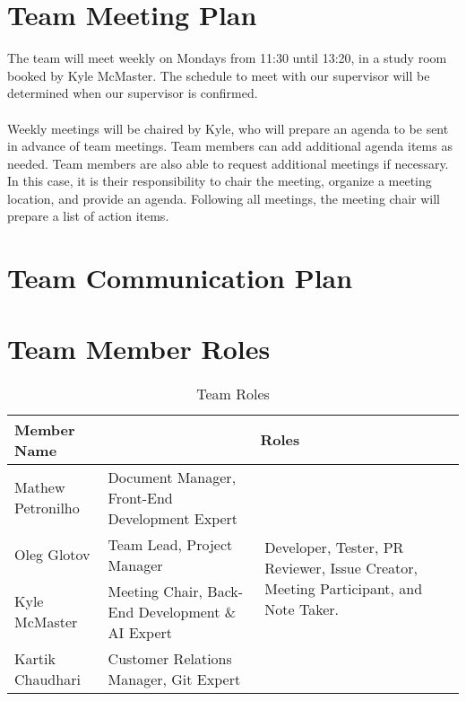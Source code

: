 \documentclass{article}
\begin{document}

\section{Team Meeting Plan}
The team will meet weekly on Mondays from 11:30 until 13:20, in a study room booked by Kyle McMaster.
The schedule to meet with our supervisor will be determined when our supervisor is confirmed.\\\\
Weekly meetings will be chaired by Kyle, who will prepare an agenda to be sent in advance of team meetings. Team members can add additional agenda items as
needed. Team members are also able to request additional meetings if necessary. In this case, it is their responsibility to chair the meeting, 
organize a meeting location, and provide an agenda. Following all meetings, the meeting chair will prepare a list of action items.

\section{Team Communication Plan}


\section{Team Member Roles}
\begin{table}[H]
  \centering
  \begin{tabular}{|p{3cm}|p{6cm}|p{3cm}|}
    \hline
    \textbf{Member Name} & \multicolumn{2}{c|}{\textbf{Roles}} \\
    \hline
    Mathew Petronilho  & Document Manager, Front-End Development Expert & \multirow{4}{*}{\parbox{3cm}{Developer, Tester, PR Reviewer, Issue Creator, Meeting Participant, and Note Taker.}}\\
    \cline{1-2} 
    Oleg Glotov & Team Lead, Project Manager & \\
    \cline{1-2} 
    Kyle McMaster & Meeting Chair, Back-End Development \& AI Expert  & \\
    \cline{1-2}
    Kartik Chaudhari & Customer Relations Manager, Git Expert & \\
    \hline
  \end{tabular}
  \caption{Team Roles}
\end{table}
\end{document}
